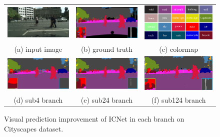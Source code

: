 \documentclass[runningheads]{llncs}
\begin{document}
\begin{figure}[bpt]
	\centering
	\begin{tabular}{ccc}
		\includegraphics[width=0.32\linewidth]{images/cu-image.pdf}&
		\includegraphics[width=0.32\linewidth]{images/cu-gt.pdf}&
		\includegraphics[width=0.32\linewidth]{images/color.pdf}\\
		{\scriptsize (a) input image} & {\scriptsize (b) ground truth} & {\scriptsize (c) colormap}\\
		\includegraphics[width=0.32\linewidth]{images/cu-sub4.pdf}&
		\includegraphics[width=0.32\linewidth]{images/cu-sub24.pdf}&
		\includegraphics[width=0.32\linewidth]{images/cu-sub124.pdf}\\
		{\scriptsize (d) sub4 branch} & {\scriptsize (e) sub24 branch} & {\scriptsize (f) sub124 branch}\\
	\end{tabular}
	\caption{Visual prediction improvement of ICNet in each branch on Cityscapes dataset.}
	\label{fig:visualcityscapes}
\end{figure}
\end{document}
